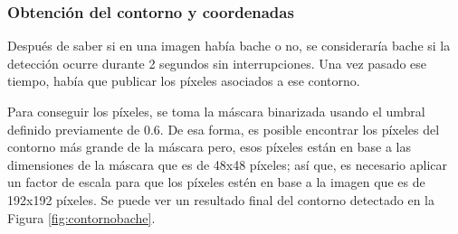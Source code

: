 \subsubsection{Obtención del contorno y coordenadas}
\label{subsec:contornoycoordenadas}

Después de saber si en una imagen había bache o no, se consideraría bache si la detección ocurre durante 2 segundos sin interrupciones. Una vez pasado ese tiempo, había que publicar los píxeles asociados a ese contorno. 

Para conseguir los píxeles, se toma la máscara binarizada usando el umbral definido previamente de 0.6. De esa forma, es posible encontrar los píxeles del contorno más grande de la máscara pero, esos píxeles están en base a las dimensiones de la máscara que es de 48x48 píxeles; así que, es necesario aplicar un factor de escala para que los píxeles estén en base a la imagen que es de 192x192 píxeles. Se puede ver un resultado final del contorno detectado en la Figura \ref{fig:contornobache}.
  

